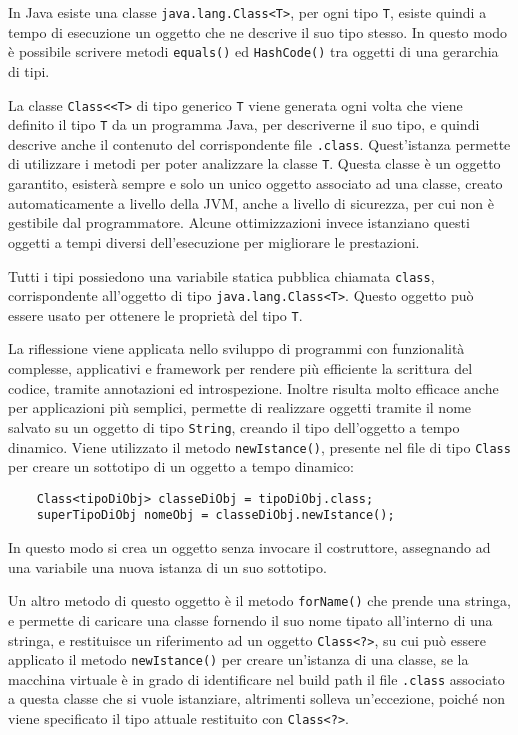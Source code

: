 \documentclass{article}
\numberwithin{equation}{subsection}
\begin{document}
In Java esiste una classe \verb|java.lang.Class<T>|,  per ogni tipo \verb|T|, esiste quindi a tempo di esecuzione un oggetto che ne descrive il suo tipo stesso. 
In questo modo è possibile scrivere metodi \verb|equals()| ed \verb|HashCode()| tra oggetti di una gerarchia di tipi. 

La classe \verb|Class<<T>| di tipo generico \verb|T| viene generata ogni volta che viene definito il tipo \verb|T| da un programma Java, per descriverne il suo tipo, e quindi 
descrive anche il contenuto del corrispondente file \verb|.class|. 
Quest'istanza permette di utilizzare i metodi per poter analizzare la classe \verb|T|. 
Questa classe è un oggetto garantito, esisterà sempre e solo un unico oggetto associato ad una classe, creato automaticamente a livello della JVM, anche a livello di sicurezza, 
per cui non è gestibile dal programmatore. 
Alcune ottimizzazioni invece istanziano questi oggetti a tempi diversi dell'esecuzione per migliorare le prestazioni. 

Tutti i tipi possiedono una variabile statica pubblica chiamata \verb|class|, corrispondente all'oggetto di tipo \verb|java.lang.Class<T>|. 
Questo oggetto può essere usato per ottenere le proprietà del tipo \verb|T|. 


La riflessione viene applicata nello sviluppo di programmi con funzionalità complesse, applicativi e framework per rendere più efficiente la scrittura del codice, tramite 
annotazioni ed introspezione. 
Inoltre risulta molto efficace anche per applicazioni più semplici, permette di realizzare oggetti tramite il nome salvato su un oggetto di tipo \verb|String|, 
creando il tipo dell'oggetto a tempo dinamico. Viene utilizzato il metodo \verb|newIstance()|, presente nel file di tipo \verb|Class| per creare un sottotipo di un 
oggetto a tempo dinamico: 
\begin{verbatim}
    Class<tipoDiObj> classeDiObj = tipoDiObj.class;
    superTipoDiObj nomeObj = classeDiObj.newIstance(); 
\end{verbatim}
In questo modo si crea un oggetto senza invocare il costruttore, assegnando ad una variabile una nuova istanza di un suo sottotipo. 

Un altro metodo di questo oggetto è il metodo \verb|forName()| che prende una stringa, e permette di caricare una classe fornendo il suo nome tipato all'interno di una stringa, 
e restituisce un riferimento ad un oggetto \verb|Class<?>|, su cui può essere applicato il metodo \verb|newIstance()| per creare un'istanza di una classe, se la macchina virtuale 
è in grado di identificare nel build path il file \verb|.class| associato a questa classe che si vuole istanziare, altrimenti solleva un'eccezione, poiché non viene specificato il 
tipo attuale restituito con \verb|Class<?>|. 
\end{document}
